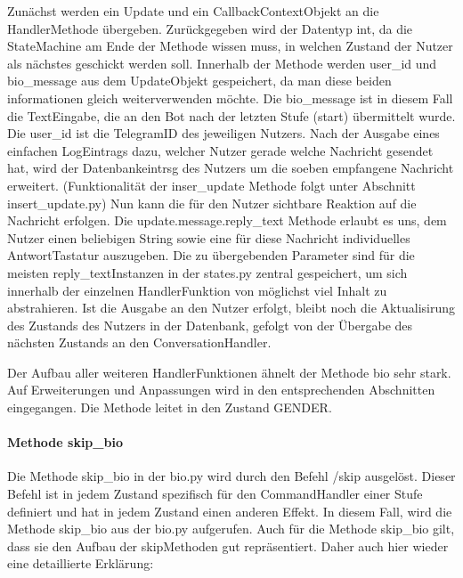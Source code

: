                 Zunächst werden ein Update\- und ein CallbackContext\-Objekt an die Handler\-Methode übergeben. Zurückgegeben wird der Datentyp int, da die State\-Machine am Ende der Methode wissen muss, in welchen Zustand der Nutzer als nächstes geschickt werden soll. 
                Innerhalb der Methode werden user\_id und bio\_message aus dem Update\-Objekt gespeichert, da man diese beiden informationen gleich weiterverwenden möchte. Die bio\_message ist in diesem Fall die Text\-Eingabe, die an den Bot nach der letzten Stufe (start) übermittelt wurde. Die user\_id ist die Telegram\-ID des jeweiligen Nutzers. 
                Nach der Ausgabe eines einfachen Log\-Eintrags dazu, welcher Nutzer gerade welche Nachricht gesendet hat, wird der Datenbankeintrsg des Nutzers um die soeben empfangene Nachricht erweitert. (Funktionalität der inser\_update Methode folgt unter Abschnitt insert\_update.py)
                Nun kann die für den Nutzer sichtbare Reaktion auf die Nachricht erfolgen. Die update.message.reply\_text Methode erlaubt es uns, dem Nutzer einen beliebigen String sowie eine für diese Nachricht individuelles Antwort\-Tastatur auszugeben. Die zu übergebenden Parameter sind für die meisten reply\_text\-Instanzen in der states.py zentral gespeichert, um sich innerhalb der einzelnen Handler\-Funktion von möglichst viel Inhalt zu abstrahieren.
                Ist die Ausgabe an den Nutzer erfolgt, bleibt noch die Aktualisirung des Zustands des Nutzers in der Datenbank, gefolgt von der Übergabe des nächsten Zustands an den ConversationHandler.

                Der Aufbau aller weiteren Handler\-Funktionen ähnelt der Methode bio sehr stark. Auf Erweiterungen und Anpassungen wird in den entsprechenden Abschnitten eingegangen. Die Methode leitet in den Zustand GENDER.

            \paragraph{Methode skip\_bio}
                Die Methode skip\_bio in der bio.py wird durch den Befehl /skip ausgelöst. Dieser Befehl ist in jedem Zustand spezifisch für den CommandHandler einer Stufe definiert und hat in jedem Zustand einen anderen Effekt. In diesem Fall, wird die Methode skip\_bio aus der bio.py aufgerufen. Auch für die Methode skip\_bio gilt, dass sie den Aufbau der skip\-Methoden gut repräsentiert. Daher auch hier wieder eine detaillierte Erklärung:

